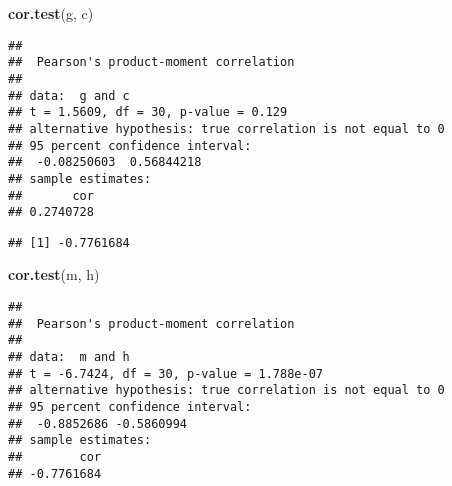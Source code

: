 \documentclass[
]{article}
\newenvironment{Shaded}{\begin{snugshade}}{\end{snugshade}}
\newcommand{\CommentTok}[1]{\textcolor[rgb]{0.56,0.35,0.01}{\textit{#1}}}
\newcommand{\KeywordTok}[1]{\textcolor[rgb]{0.13,0.29,0.53}{\textbf{#1}}}
\newcommand{\NormalTok}[1]{#1}
\newcommand{\OperatorTok}[1]{\textcolor[rgb]{0.81,0.36,0.00}{\textbf{#1}}}
\newcommand{\StringTok}[1]{\textcolor[rgb]{0.31,0.60,0.02}{#1}}
\begin{document}
\begin{Shaded}
\begin{Highlighting}[]
\KeywordTok{cor.test}\NormalTok{(g, c)}
\end{Highlighting}
\end{Shaded}

\begin{verbatim}
## 
##  Pearson's product-moment correlation
## 
## data:  g and c
## t = 1.5609, df = 30, p-value = 0.129
## alternative hypothesis: true correlation is not equal to 0
## 95 percent confidence interval:
##  -0.08250603  0.56844218
## sample estimates:
##       cor 
## 0.2740728
\end{verbatim}

\begin{Shaded}
\end{Shaded}

\begin{verbatim}
## [1] -0.7761684
\end{verbatim}

\begin{Shaded}
\begin{Highlighting}[]
\KeywordTok{cor.test}\NormalTok{(m, h)}
\end{Highlighting}
\end{Shaded}

\begin{verbatim}
## 
##  Pearson's product-moment correlation
## 
## data:  m and h
## t = -6.7424, df = 30, p-value = 1.788e-07
## alternative hypothesis: true correlation is not equal to 0
## 95 percent confidence interval:
##  -0.8852686 -0.5860994
## sample estimates:
##        cor 
## -0.7761684
\end{verbatim}

\begin{Shaded}
\end{Shaded}
\end{document}
